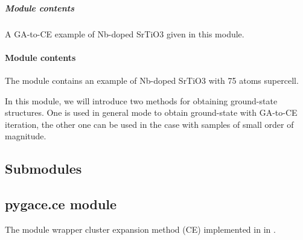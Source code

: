 \documentclass[letterpaper,10pt,english]{sphinxmanual}
\begin{document}
\subparagraph{Module contents}
\label{\detokenize{pygace.examples.sto:module-contents}}\label{\detokenize{pygace.examples.sto:module-pygace.examples.sto}}
A GA-to-CE example of Nb-doped SrTiO3 given in this module.


\paragraph{Module contents}
\label{\detokenize{pygace.examples:module-contents}}\label{\detokenize{pygace.examples:module-pygace.examples}}
The module contains an example of Nb-doped SrTiO3 with 75 atoms supercell.

In this module, we will introduce two methods for obtaining ground-state
structures. One is used in general mode to obtain ground-state with GA-to-CE
iteration, the other one can be used in the case with samples of small
order of magnitude.


\subsection{Submodules}
\label{\detokenize{pygace:submodules}}

\subsection{pygace.ce module}
\label{\detokenize{pygace:module-pygace.ce}}\label{\detokenize{pygace:pygace-ce-module}}
The module wrapper cluster expansion method (CE) implemented in  in
.
\end{document}
